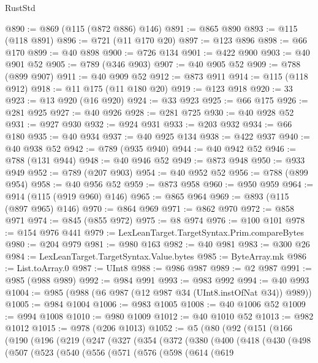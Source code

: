 \begin{lexlean}{RustStd}
\begin{coremodule}
@890 := @869 (@115 (@872 @886) @146)
@891 := @865 @890
@893 := @115 (@118 @891)
@896 := @721 (@11 @170 @20)
@897 := @123 @896
@898 := @66 @170
@899 := @40 @898
@900 := @726 @134
@901 := @422 @900
@903 := @40 @901 @52
@905 := @789 (@346 @903)
@907 := @40 @905 @52
@909 := @788 (@899 @907)
@911 := @40 @909 @52
@912 := @873 @911
@914 := @115 (@118 @912)
@918 := @11 @175 (@11 @180 @20)
@919 := @123 @918
@920 := 33
@923 := @13 @920 (@16 @920)
@924 := @33 @923
@925 := @66 @175
@926 := @281 @925
@927 := @40 @926
@928 := @281 @725
@930 := @40 @928 @52
@931 := @927 @930
@932 := @924 @931
@933 := @203 @932
@934 := @66 @180
@935 := @40 @934
@937 := @40 @925 @134
@938 := @422 @937
@940 := @40 @938 @52
@942 := @789 (@935 @940)
@944 := @40 @942 @52
@946 := @788 (@131 @944)
@948 := @40 @946 @52
@949 := @873 @948
@950 := @933 @949
@952 := @789 (@207 @903)
@954 := @40 @952 @52
@956 := @788 (@899 @954)
@958 := @40 @956 @52
@959 := @873 @958
@960 := @950 @959
@964 := @914 (@115 (@919 @960) @146)
@965 := @865 @964
@969 := @893 (@115 (@897 @965) @146)
@970 := @864 @969
@971 := @862 @970
@972 := @858 @971
@974 := @845 (@855 @972)
@975 := @8 @974
@976 := @100 @101
@978 := @154 @976 @441
@979 := LexLeanTarget.TargetSyntax.Prim.compareBytes
@980 := @204 @979
@981 := @980 @163
@982 := @40 @981
@983 := @300 @26
@984 := LexLeanTarget.TargetSyntax.Value.bytes
@985 := ByteArray.mk
@986 := List.toArray.{0}
@987 := UInt8
@988 := @986 @987
@989 := @2 @987
@991 := @985 (@988 @989)
@992 := @984 @991
@993 := @983 @992
@994 := @40 @993
@1004 := @985 (@988 (@6 @987 (@12 @987 @34 (UInt8.instOfNat @34)) @989))
@1005 := @984 @1004
@1006 := @983 @1005
@1008 := @40 @1006 @52
@1009 := @994 @1008
@1010 := @980 @1009
@1012 := @40 @1010 @52
@1013 := @982 @1012
@1015 := @978 (@206 @1013)
@1052 := @5
    (@80
      (@92
        (@151
          (@166
            (@190
              (@196
                (@219
                  (@247
                    (@327
                      (@354
                        (@372
                          (@380
                            (@400
                              (@418
                                (@430
                                  (@498
                                    (@507
                                      (@523
                                        (@540
                                          (@556
                                            (@571
                                              (@576
                                                (@598
                                                  (@614
                                                    (@619

\end{coremodule}
\end{lexlean}
